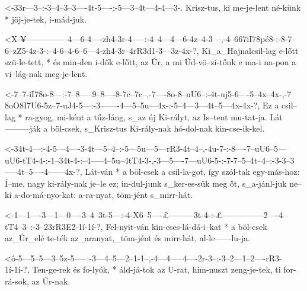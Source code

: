 


  {<-33r---3--:-3--4--3--3----4t-5----:-5---3--4t---4-4---3-.}
  {  Krisz-tus, ki me-je-lent né-künk * jöj-je-tek, i-mád-juk.}



  {<X-¥---------------4---6-4----zh4-3r-4-----:-4--4---4---6-4z--4-3---,-4--667iI78pé8-:-8-7--6--zZ5-4z-3-:--4-6--4-6--6---4-zh4-3r--4rR3d1-3---3z-4x-?,}
  {   Ki_a_Hajnalcsil-lag e-lőtt szü-le-tett, * és min-den i-dők e-lőtt, az Úr,          a mi Üd-vö--zí-tőnk e ma-i na-pon a vi--lág-nak    meg-je-lent.}

  {<-7--7-iI78o-8---:-7--8-----9--8----8-7c--7c--,-7----8o-8--uU6--:-4t-uj5-6----5--4x--4x-,-7\\8oO8I7U6-5z--7-uJ4-5---:-3-------4---5--5u---4x-:-5--4---3---4t--5---4x-4x-?,}
  {  Ez a csil--lag * ra-gyog, mi-ként a tűz-láng, s_az új Ki-rályt, az Is--tent mu-tat-ja.  Lát---------ják a böl-csek, s_Krisz-tus Ki-rály-nak  hó-dol-nak kin-cse-ik-kel.}

  {<-34t-4---:-4-5---4----3-4t---5--4--:-5---5u---5---rR3-4t--4--,-4u-7-:-8----7--uU6--5---uU6-tT4-4-:-1--34t-4-:--4-----4--5u--4tT4-3-,-3---5----7---uU6-5-:-7-7--5--4t--4--:-3-3--3-----4t--5----4------4x-?,}
  {  Lát-ván * a böl-csek a csil-la-got, így szól-tak egy-más-hoz: Í--me, nagy ki-rály-nak je--le  ez; in-dul-junk s_ker-es-sük meg  őt, s_a-jánl-juk ne--ki  a-do-má-nyo-kat: a-ra-nyat, töm-jént s_mirr-hát.}


  {<-1---1----3---1---0----3--4--3t-5---:-4-X6--5----£---------3t-4-:-£---------------2----4--tT4--3--:-3--23rR3E2-1í-1í-?,}
  {  Fel-nyit-ván kin-cses-lá-dá-i--kat * a böl-csek az_Úr_elé te-ték az_aranyat,_töm-jént és mirr-hát, al-le------lu-ja.}

  {<ô-5---5--5---3--5z-5-----:-3---4--5---2--1-1--,-4---4-----4----2r-3--:-3--2---1--2----rR3-1í-1í-?,}
  {   Ten-ge-rek és fo-lyók, * áld-já-tok az U-rat, him-nuszt zeng-je-tek, ti for-rá-sok, az  Úr-nak.}


